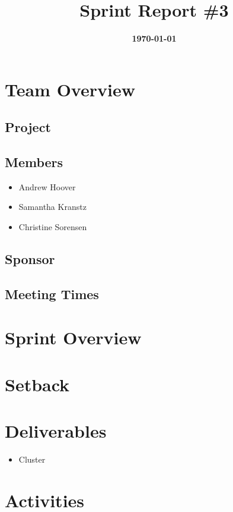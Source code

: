 \documentclass{article}
\title{\normalfont\Large\bfseries\color{TitleColor}Sprint Report \#3}
\date{\normalfont\bfseries\color{TitleColor}\today}
\begin{document}
\maketitle

\section*{Team Overview}
\subsection*{Project}

\subsection*{Members}
\begin{itemize}
	\item Andrew Hoover
	\item Samantha Kranstz
	\item Christine Sorensen
\end{itemize}

\subsection*{Sponsor}

\subsection*{Meeting Times}

\section*{Sprint Overview}

\section*{Setback}


\section*{Deliverables}
\begin{itemize}
	\item Cluster
\end{itemize}

\section*{Activities}
\end{document}
